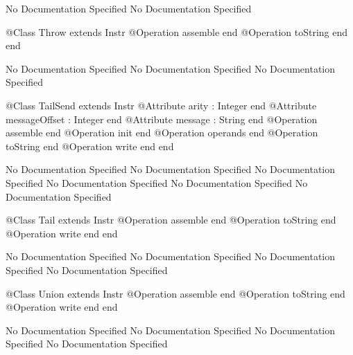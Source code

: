 No Documentation Specified
No Documentation Specified
\begin{Interface}
@Class Throw extends Instr
  @Operation assemble end
  @Operation toString end
end
\end{Interface}
No Documentation Specified
No Documentation Specified
No Documentation Specified
\begin{Interface}
@Class TailSend extends Instr
  @Attribute arity : Integer end
  @Attribute messageOffset : Integer end
  @Attribute message : String end
  @Operation assemble end
  @Operation init end
  @Operation operands end
  @Operation toString end
  @Operation write end
end
\end{Interface}
No Documentation Specified
No Documentation Specified
No Documentation Specified
No Documentation Specified
No Documentation Specified
No Documentation Specified
\begin{Interface}
@Class Tail extends Instr
  @Operation assemble end
  @Operation toString end
  @Operation write end
end
\end{Interface}
No Documentation Specified
No Documentation Specified
No Documentation Specified
No Documentation Specified
\begin{Interface}
@Class Union extends Instr
  @Operation assemble end
  @Operation toString end
  @Operation write end
end
\end{Interface}
No Documentation Specified
No Documentation Specified
No Documentation Specified
No Documentation Specified
